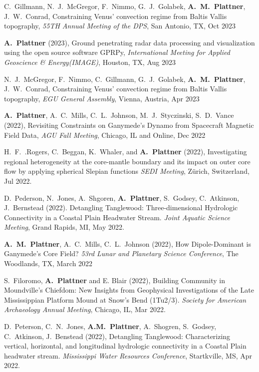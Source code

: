 \documentclass[10pt]{article}
\begin{document}
\spcp
C.~Gillmann, N.~J.~McGregor, F.~Nimmo, G.~J.~Golabek, \textbf{A.~M.~Plattner}, J.~W.~Conrad, Constraining Venus' convection regime from Baltis Vallis topography, \emph{55TH Annual Meeting of the DPS}, San Antonio, TX, Oct 2023


\spcp \textbf{A.~Plattner} (2023), Ground penetrating radar data processing and visualization using the open source software GPRPy, \emph{International Meeting for Applied Geoscience \& Energy(IMAGE)}, Houston, TX, Aug 2023

\spcp
N.~J.~McGregor, F.~Nimmo, C.~Gillmann, G.~J.~Golabek, \textbf{A.~M.~Plattner}, J.~W.~Conrad, Constraining Venus' convection regime from Baltis Vallis topography, \emph{EGU General Assembly}, Vienna, Austria, Apr 2023

\spcp \textbf{A.~Plattner}, A.~C.~Mills, C.~L.~Johnson,
M.~J.~Styczinski, S.~D.~Vance (2022), Revisiting Constraints on
Ganymede's Dynamo from Spacecraft Magnetic Field Data, \emph{AGU Fall
Meeting}, Chicago, IL and Online, Dec 2022

\spcp H.~F.~.Rogers, C.~Beggan, K.~Whaler, and \textbf{A.~Plattner}
(2022), Investigating regional heterogeneity at the core-mantle
boundary and its impact on outer core flow by applying spherical
Slepian functions \emph{SEDI Meeting}, Z\"urich, Switzerland, Jul 2022.

\spcp D.~Pederson, N.~Jones, A.~Shgoren, \textbf{A.~Plattner},
S.~Godsey, C.~Atkinson, J.~Bernstead (2022). Detangling Tanglewood:
Three-dimensional Hydrologic Connectivity in a Coastal Plain Headwater
Stream. \emph{Joint Aquatic Science Meeting}, Grand Rapids, MI, May
2022.

\spcp \textbf{A.~M.~Plattner}, A.~C.~Mills, C.~L.~Johnson (2022), How
Dipole-Dominant is Ganymede’s Core Field?  \emph{53rd Lunar and
Planetary Science Conference}, The Woodlands, TX, March 2022

\spcp S.~Filoromo, \textbf{A.~Plattner} and E. Blair (2022), Building
Community in Moundville's Chiefdom: New Insights from Geophysical
Investigations of the Late Mississippian Platform Mound at Snow's Bend
(1Tu2/3). \emph{Society for American Archaeology Annual Meeting}, Chicago,
IL, Mar 2022.

\spcp D.~Peterson, C.~N.~Jones, \textbf{A.M.~Plattner}, A.~Shogren,
S.~Godsey, C.~Atkinson, J.~Benstead (2022), Detangling Tanglewood:
Characterizing vertical, horizontal, and longitudinal hydrologic
connectivity in a Coastal Plain headwater stream. \emph{Mississippi
Water Resources Conference}, Startkville, MS, Apr 2022.
\end{document}
